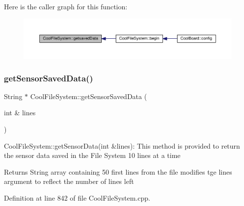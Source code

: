 Here is the caller graph for this function\+:\nopagebreak
\begin{figure}[H]
\begin{center}
\leavevmode
\includegraphics[width=350pt]{db/d0c/class_cool_file_system_a70701d05e811604af1b531f4f6dc69ed_icgraph}
\end{center}
\end{figure}
\mbox{\label{class_cool_file_system_a3223ffff4266a6300988fab956d6b4b2}} 
\subsubsection{\texorpdfstring{get\+Sensor\+Saved\+Data()}{getSensorSavedData()}}
{\footnotesize\ttfamily String $\ast$ Cool\+File\+System\+::get\+Sensor\+Saved\+Data (\begin{DoxyParamCaption}\item[{int \&}]{lines }\end{DoxyParamCaption})}

Cool\+File\+System\+::get\+Sensor\+Data(int \&lines)\+: This method is provided to return the sensor data saved in the File System 10 lines at a time

\begin{DoxyReturn}{Returns}
String array containing 50 first lines from the file modifies tge lines argument to reflect the number of lines left 
\end{DoxyReturn}


Definition at line 842 of file Cool\+File\+System.\+cpp.


